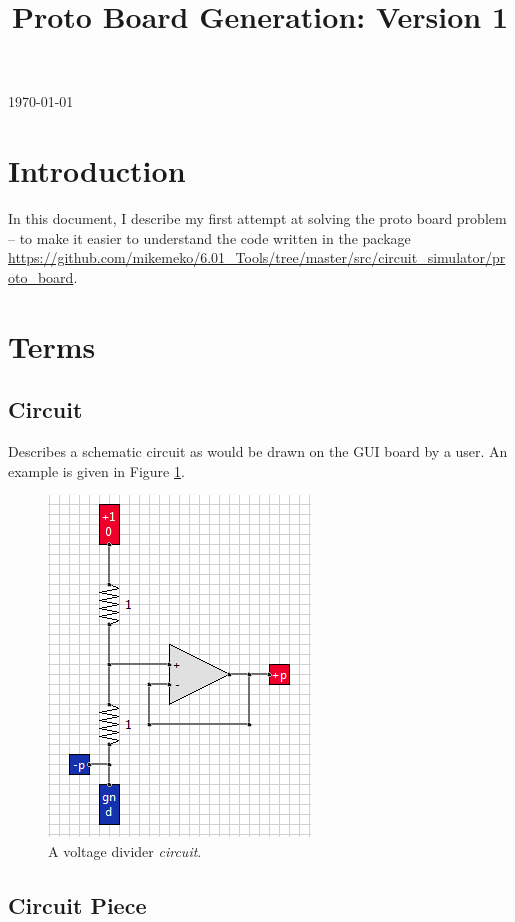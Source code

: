 \documentclass[12pt]{amsart}
\title{Proto Board Generation: Version 1}
\begin{document}
\today
\maketitle

\section{Introduction}

In this document, I describe my first attempt at solving the proto board problem -- to make it easier to understand the code written in the package \url{https://github.com/mikemeko/6.01_Tools/tree/master/src/circuit_simulator/proto_board}.

\section{Terms}

\subsection{Circuit}

Describes a schematic circuit as would be drawn on the GUI board by a user. An example is given in Figure \ref{fig:circuit}.

\begin{figure}
\includegraphics{Images/Circuit.png}
\caption{A voltage divider \emph{circuit}.}
\label{fig:circuit}
\end{figure}

\subsection{Circuit Piece}
\end{document}
